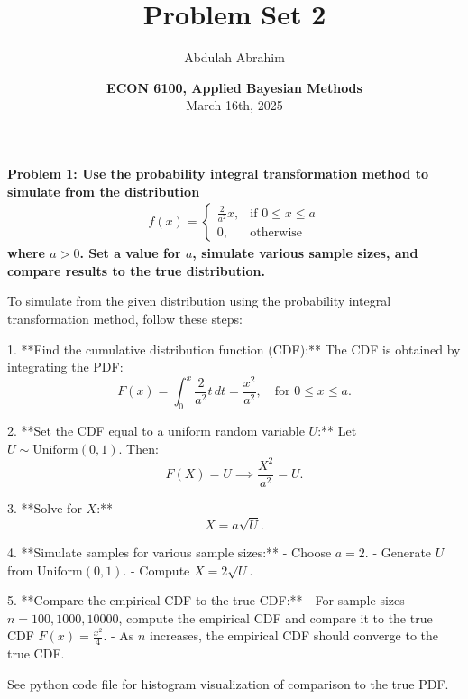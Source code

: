 \documentclass[12pt]{article}
\title{Problem Set 2} %
\date{\textbf{ECON 6100, Applied Bayesian Methods} \\ March 16th, 2025} %
\author{Abdulah Abrahim} %
\begin{document}
\maketitle

\pagestyle{myheadings} %

\pagebreak

\begin{homeworkProblem}
\textbf{Problem 1: Use the probability integral transformation method to simulate from the distribution}
\textbf{\begin{gather}
    f(x) = 
    \begin{cases}
        \frac{2}{a^2}x,  & \text{if }0\leq x\leq a \\
        0, & \text{otherwise}
    \end{cases}
\end{gather}
where \( a > 0 \). Set a value for \( a \), simulate various sample sizes, and compare results to the true distribution.}

\begin{solution}
To simulate from the given distribution using the probability integral transformation method, follow these steps:

1. **Find the cumulative distribution function (CDF):**
   The CDF is obtained by integrating the PDF:
   \[
   F(x) = \int_{0}^{x} \frac{2}{a^2} t \, dt = \frac{x^2}{a^2}, \quad \text{for } 0 \leq x \leq a.
   \]

2. **Set the CDF equal to a uniform random variable \( U \):**
   Let \( U \sim \text{Uniform}(0,1) \). Then:
   \[
   F(X) = U \implies \frac{X^2}{a^2} = U.
   \]

3. **Solve for \( X \):**
   \[
   X = a \sqrt{U}.
   \]

4. **Simulate samples for various sample sizes:**
   - Choose \( a = 2 \).
   - Generate \( U \) from \( \text{Uniform}(0,1) \).
   - Compute \( X = 2 \sqrt{U} \).

5. **Compare the empirical CDF to the true CDF:**
   - For sample sizes \( n = 100, 1000, 10000 \), compute the empirical CDF and compare it to the true CDF \( F(x) = \frac{x^2}{4} \).
   - As \( n \) increases, the empirical CDF should converge to the true CDF.

   See python code file for histogram visualization of comparison to the true PDF. 
\end{solution}
\end{homeworkProblem}
\end{document}
